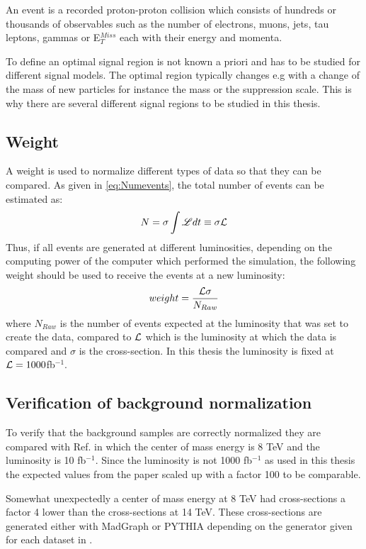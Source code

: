 An event is a recorded proton-proton collision which consists of hundreds or thousands of observables such as the number of electrons, muons, jets, tau leptons, gammas or E$^{Miss}_T$ each with their energy and momenta.

To define an optimal signal region is not known a priori and has to be studied for different signal models. The optimal region typically changes e.g with a change of the mass of new particles for instance the \abbrWIMP mass or the suppression scale. This is why there are several different signal regions to be studied in this thesis.

\subsection{Weight}
A weight is used to normalize different types of data so that they can be compared. 
As given in \eqref{eq:Numevents}, the total number of events can be estimated as:
\begin{equation}
N=\sigma \int \mathscr{L} dt \equiv \sigma \mathcal{L}
\end{equation}
Thus, if all events are generated at different luminosities, depending on the computing power of the computer which performed the simulation, the following weight should be used to receive the events at a new luminosity:
\begin{equation}
weight=\frac{\mathcal{L} \sigma}{N_{Raw}}
\end{equation}
where $N_{Raw}$ is the number of events expected at the luminosity that was set to create the data, compared to $\mathcal{L}$ which is the luminosity at which the data is compared and $\sigma$ is the cross-section. In this thesis the luminosity is fixed at $\mathcal{L}=1000$fb$^{-1}$.

\subsection{Verification of background normalization} 	
To verify that the background samples are correctly normalized they are compared with Ref. \citep{ATLAS-CONF-2012-147} in which the center of mass energy is 8 TeV and the luminosity is 10 fb$^{-1}$. Since the luminosity is not 1000 fb$^{-1}$ as used in this thesis the expected values from the paper scaled up with a factor 100 to be comparable. 

Somewhat unexpectedly a center of mass energy at 8 TeV had cross-sections a factor 4 lower than the cross-sections at 14 TeV. 
These cross-sections are generated either with MadGraph\citep{madgraph} or PYTHIA\citep{Sjostrand:2008} depending on the generator given for each dataset in . 

